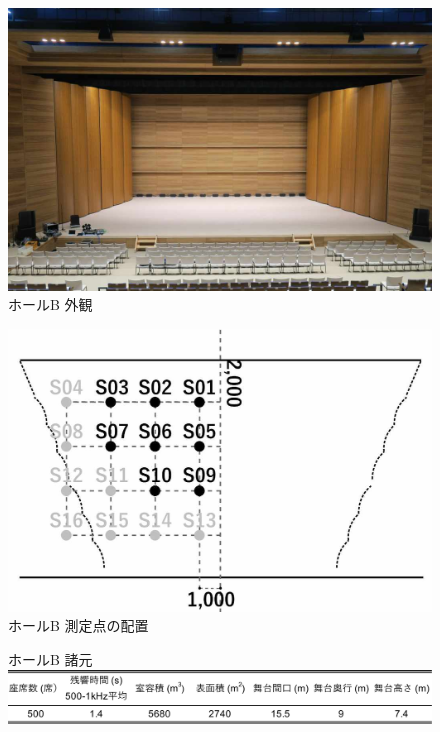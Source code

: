 \documentclass[11pt,a4j]{jreport}
\begin{document}
  \begin{figure}[H]
    \begin{minipage}{.5\linewidth} %
      \centering
      \includegraphics[width=.7\linewidth]{images/measuredHalls/resized/picture_b.jpg}
      \\ホールB 外観
    \end{minipage}%
    \begin{minipage}{.5\linewidth} %
      \centering
      \includegraphics[width=.7\linewidth]{images/measuredHalls/resized/flat_b.jpg}
      \\ホールB 測定点の配置
    \end{minipage}

    \begin{minipage}{1\linewidth}
      \centering
      ホールB 諸元\\
      \includegraphics[width=.8\linewidth]{images/measuredHalls/informationTable/b.pdf}
    \end{minipage}
  \end{figure}
\end{document}
